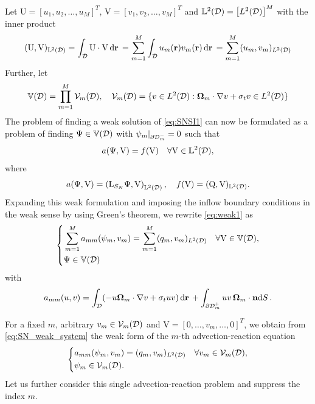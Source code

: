 Let $\mathrm{U} = [u_1,u_2,\ldots,u_M]^T$, $\mathrm{V} = [v_1,v_2,\ldots,v_M]^T$ and $\LL{\VV} =
\bigl[\Lp[2](\VV)\bigr]^M$ with the inner product 
$$
\ip{\LL{\VV}}{\mathrm{U},\mathrm{V}} = \int_{\VV}\mathrm{U}\cdot\mathrm{V}\,\d{\br} = \sum_{m=1}^M \int_{\VV} u_m(\br)
v_m(\br)\,\d{\br} = \sum_{m=1}^M (u_m, v_m)_{\Lp[2](\VV)}
$$
Further, let
$$
	\mathbb{V}(\VV) = \prod_{m=1}^M \Space_{m}(\VV),\quad \Space_{m}(\VV) = \{v\in\Lp[2](\VV): 
	\bomega_m\cdot\nabla v + \sigma_t v \in\Lp[2](\VV)\}
$$
The problem of finding a weak solution of \eqref{eq:SNSI1} can now be formulated as a problem
of finding $\Psi \in \mathbb{V}(\VV)$ with $\psi_m\vert_{\pVm[-]{m}} = 0$ such that 
\begin{equation}\label{eq:weak1}
	a(\Psi,\mathrm{V}) = f(\mathrm{V}) \quad \forall \mathrm{V}\in	\LL\VV,
\end{equation}
where
$$
	a(\Psi,\mathrm{V}) = \left(\mathrm{L}_{S_N} \Psi, \mathrm{V}\right)_{\LL\VV},\quad 
	f(\mathrm{V}) = (\mathrm{Q}, \mathrm{V})_{\LL\VV}.
$$%
Expanding this weak formulation and imposing the inflow boundary conditions in the weak sense by using Green's theorem,
we rewrite \eqref{eq:weak1} as
\begin{equation}\label{eq:SN_weak_system}
\left\{
\begin{aligned}
	& \sum_{m=1}^M a_{mm}(\psi_m, v_m) = \sum_{m=1}^M (q_m, v_m)_{\Lp[2](\VV)} \quad \forall
	\mathrm{V}\in\mathbb{V}(\VV),\\
	& \Psi \in \mathbb{V}(\VV)
\end{aligned}
\right.
\end{equation}
with
$$
	a_{mm}(u, v) = \int_{\VV} (-u\bomega_m\cdot\nabla v + 
	\sigma_t u v)\,\d{\br} + \int_{\pVm[+]{m}} u v\, \bomega_m\cdot\bn \d{S}.
$$


For a fixed $m$, arbitrary $v_m\in \Space_m(\VV)$ and $\mathrm{V} =
[0,\ldots,v_m,\ldots, 0]^T$, we obtain from \eqref{eq:SN_weak_system} the weak form of the
$m$-th advection-reaction equation
\begin{equation}\label{eq:SN_weak_one}
\left\{
\begin{aligned}
	& a_{mm}(\psi_m, v_m) = (q_m, v_m)_{\Lp[2](\VV)} \quad \forall v_m\in \Space_m(\VV),\\
	& \psi_m \in \Space_{m}(\VV).
\end{aligned}
\right.
\end{equation}
Let us further consider this single advection-reaction problem and suppress the index $m$. 

